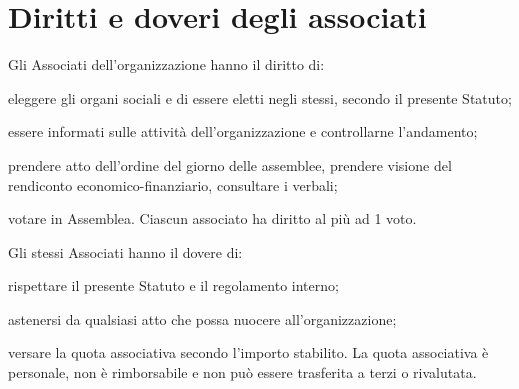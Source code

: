 \documentclass[legalpaper, 11pt]{exam}
\let\tempone\enumerate
\let\temptwo\endenumerate
\renewenvironment{enumerate}{\tempone\addtolength{\itemsep}{-0.45\baselineskip}}{\temptwo}
\begin{document}
{\section{Diritti e doveri degli associati}
\begin{enumerate}
 \item Gli Associati dell'organizzazione hanno il diritto di:
 \vspace{-5pt}
 \begin{enumerate}
  \item eleggere gli organi sociali e di essere eletti negli stessi, secondo il presente Statuto;
  \item essere informati sulle attività dell’organizzazione e controllarne l’andamento;
  \item prendere atto dell’ordine del giorno delle assemblee, prendere visione del rendiconto economico-finanziario, consultare i verbali;
  \item votare in Assemblea. Ciascun associato ha diritto al più ad 1 voto.
 \end{enumerate}
\item Gli stessi Associati hanno il dovere di:
\vspace{-5pt}
\begin{enumerate}
 \item rispettare il presente Statuto e il regolamento interno;
 \item astenersi da qualsiasi atto che possa nuocere all’organizzazione;
 \item versare la quota associativa secondo l’importo stabilito. La quota associativa è personale, non è rimborsabile e non può essere trasferita a terzi o rivalutata.
\end{enumerate}

\end{enumerate}

}
\end{document}
